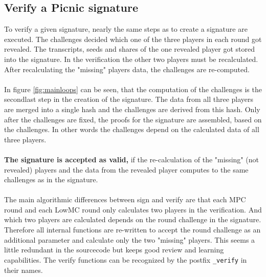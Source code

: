 \documentclass[]{article}
\begin{document}
\subsection{Verify a Picnic signature}
To verify a given signature, nearly the same steps as to create a signature are executed. The challenges decided which one of the three players in each round got revealed. The transcripts, seeds and  shares of the one revealed player got stored into the signature. In the verification the other two players must be recalculated. After recalculating the "missing" players data, the challenges are re-computed. \\ \\
In figure \ref{fig:mainloops} can be seen, that the computation of the challenges is the secondlast step in the creation of the signature. The data from all three players are merged into a single hash and the challenges are derived from this hash. Only after the challenges are fixed, the proofs for the signature are assembled, based on the challenges. In other words the challenges depend on the calculated data of all three players.\\ \\
\textbf{The signature is accepted as valid,} if the re-calculation of the "missing" (not revealed) players and the data from the revealed player computes to the same challenges as in the signature.\\ \\
The main algorithmic differences between sign and verify are that each MPC round and each LowMC round only calculates two players in the verification. And which two players are calculated depends on the round challenge in the signature. Therefore all internal functions are re-written to accept the round challenge as an additional parameter and calculate only the two "missing" players. This seems a little redundant in the sourcecode but keeps good review and learning capabilities. The verify functions can be recognized by the postfix \texttt{\_verify} in their names.  
\end{document}
